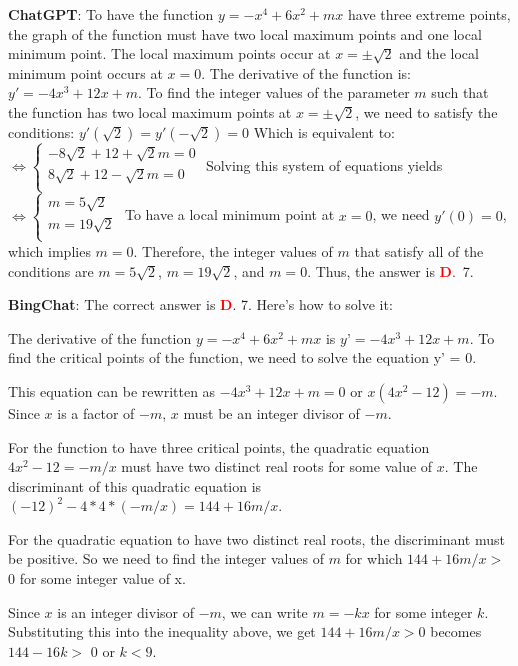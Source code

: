 \documentclass{article}
\begin{document}
{\begin{mdframed}[linewidth=1pt,linecolor=red]
		\textbf{ChatGPT}: To have the function $y=-x^4+6x^2+mx$ have three extreme points, the graph of the function must have two local maximum points and one local minimum point. The local maximum points occur at $x=\pm\sqrt{2}$ and the local minimum point occurs at $x=0$. The derivative of the function is: $ y' = -4x^3 + 12x + m $. To find the integer values of the parameter $m$ such that the function has two local maximum points at $x=\pm\sqrt{2}$, we need to satisfy the conditions: 
		$ y'(\sqrt{2})=y'(-\sqrt{2})=0$ 
		Which is equivalent to:
		$ \Leftrightarrow 
		\left\{\begin{matrix}
			-8\sqrt{2}+12+\sqrt{2}m=0  \\
			8\sqrt{2}+12-\sqrt{2}m=0 \\
		\end{matrix}\right.
		$ 
		Solving this system of equations yields
		$ \Leftrightarrow 
		\left\{\begin{matrix}
			m = 5\sqrt{2}  \\
			m = 19\sqrt{2} \\
		\end{matrix}\right.
		$
		To have a local minimum point at $x=0$, we need $y'(0)=0$, which implies $m=0$. Therefore, the integer values of $m$ that satisfy all of the conditions are $m=5\sqrt{2}$, $m=19\sqrt{2}$, and $m=0$. Thus, the answer is \textcolor{red}{\textbf{D}}.~7.
		
		\textbf{BingChat}: The correct answer is \textcolor{red}{\textbf{D}}. 7. Here’s how to solve it:
		
		The derivative of the function $y = -x^4 + 6x^2 + mx$ is $y’ = -4x^3 + 12x + m$. To find the critical points of the function, we need to solve the equation y’ = 0.
		
		This equation can be rewritten as $-4x^3 + 12x + m = 0$ or $x(4x^2 - 12) = -m$. Since $x$ is a factor of $-m$, $x$ must be an integer divisor of $-m$.
		
		For the function to have three critical points, the quadratic equation $4x^2 - 12 = -m/x$ must have two distinct real roots for some value of $x$. The discriminant of this quadratic equation is $(-12)^2 - 4 * 4 * (-m/x) = 144 + 16m/x$.
		
		For the quadratic equation to have two distinct real roots, the discriminant must be positive. So we need to find the integer values of $m$ for which $144 + 16m/x >$ 0 for some integer value of x.
		
		Since $x$ is an integer divisor of $-m$, we can write $m = -kx$ for some integer $k$. Substituting this into the inequality above, we get $144 + 16m/x > 0$ becomes $144 - 16k >$ 0 or $k < 9$.
		

\end{mdframed}}
\end{document}
